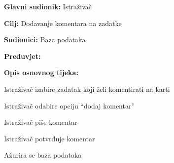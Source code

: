 					\noindent {}
					\begin{packed_item}
	
						\item \textbf{Glavni sudionik: } Istraživač
						\item  \textbf{Cilj:} Dodavanje komentara na zadatke
						\item  \textbf{Sudionici:} Baza podataka
						\item  \textbf{Preduvjet:}
						\item  \textbf{Opis osnovnog tijeka:}
						
						\item[] \begin{packed_enum}
	
							\item 	Istraživač izabire zadatak koji želi komentirati na karti
							\item 	Istraživač odabire opciju “dodaj komentar”
							\item 	Istraživač piše komentar
							\item 	Istraživač potvrđuje komentar
							\item 	Ažurira se baza podataka
							
							
						\end{packed_enum}
					\end{packed_item}%
					\noindent {}

